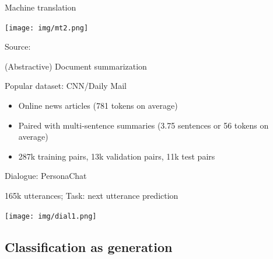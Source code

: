 \documentclass[12pt,aspectratio=169,handout]{beamer}
\begin{document}
\begin{frame}{Machine translation}
	

\texttt{[image: img/mt2.png]}
	
	
Source: 
	
\end{frame}


\begin{frame}{(Abstractive) Document summarization}

Popular dataset: CNN/Daily Mail

\begin{itemize}
	\item Online news articles (781 tokens on average)
	\item Paired with multi-sentence summaries (3.75 sentences or 56 tokens on average)
	\item 287k training pairs, 13k validation pairs, 11k test pairs
\end{itemize}


\end{frame}

\begin{frame}{Dialogue: PersonaChat}
	
165k utterances; Task: next utterance prediction
	
\texttt{[image: img/dial1.png]}


\end{frame}



\subsection{Classification as generation}
\end{document}
